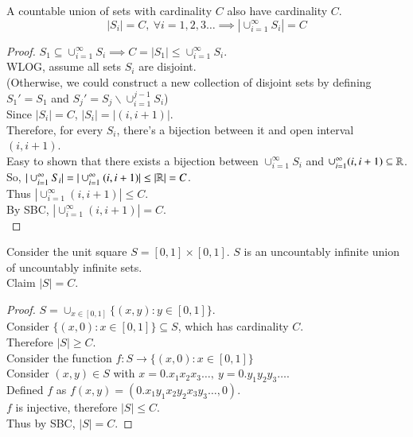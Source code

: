 \documentclass[10pt]{article}
\begin{document}
		\begin{theorem}
			A countable union of sets with cardinality $C$ also have cardinality $C$.
			\[
				|S_i| = C, \ \forall i = 1,2,3\dots \implies |\cup_{i=1}^\infty S_i| = C
			\]
			\begin{proof}
				$S_1 \subseteq \cup_{i=1}^\infty S_i \implies C = |S_1| \leq \cup_{i=1}^\infty S_i$. \\
				WLOG, assume all sets $S_i$ are disjoint. \\
				(Otherwise, we could construct a new collection of disjoint sets by defining $S_1' = S_1$ and $S_j' = S_j \backslash \cup_{i=1}^{j-1} S_{i}$) \\
				Since $|S_i| = C$, $|S_i| = |(i, i+1)|$. \\
				Therefore, for every $S_i$, there's a bijection between it and open interval $(i, i+1)$. \\
				Easy to shown that there exists a bijection between $\cup_{i=1}^\infty S_i$ and $\cup_{i=1}^\infty (i, i+1) \subseteq \mathbb{R}$. \\
				So, $|\cup_{i=1}^\infty S_i| = |\cup_{i=1}^\infty (i, i+1)| \leq |\mathbb{R}| = C$. \\
				Thus $|\cup_{i=1}^\infty (i, i+1)| \leq C$. \\
				By SBC, $|\cup_{i=1}^\infty (i, i+1)| = C$. \\
			\end{proof}
		\end{theorem}
		
		\begin{example}
			Consider the unit square $S=[0,1]\times [0,1]$. $S$ is an uncountably infinite union of uncountably infinite sets.\\
			Claim $|S| = C$. \\
			\begin{proof}
				$S = \cup_{x\in [0,1]}\{(x,y):y\in[0,1]\}$. \\
				Consider $\{(x, 0):x \in [0,1]\} \subseteq S$, which has cardinality $C$. \\
				Therefore $|S| \geq C$. \\
				Consider the function $f: S \to \{(x, 0):x \in [0,1]\}$ \\
				Consider $(x,y) \in S$ with $x = 0.x_1 x_2 x_3 \dots,\ y=0.y_1 y_2 y_3 \dots$. \\
				Defined $f$ as $f(x, y) = (0.x_1 y_1 x_2 y_2 x_3 y_3\dots, 0)$.\\
				$f$ is injective, therefore $|S| \leq C$. \\
				Thus by SBC, $|S| = C$.
			\end{proof}
		\end{example}
	
\end{document}
